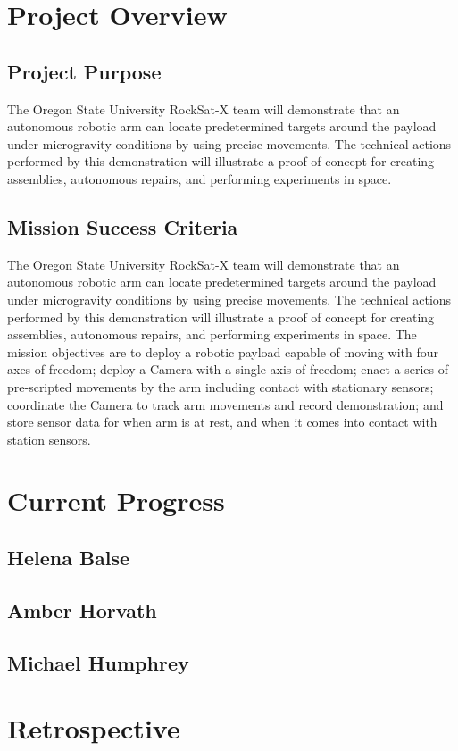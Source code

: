 \documentclass[letterpaper,10pt]{article}
\begin{document}
\section{Project Overview}
\subsection{Project Purpose}
The Oregon State University RockSat-X team will demonstrate that an autonomous robotic arm can locate predetermined
 targets around the \gls{payload} under microgravity conditions by using precise movements. 
The technical actions performed by this demonstration will illustrate a proof of concept for creating assemblies, 
autonomous repairs, and performing experiments in space.
\subsection{Mission Success Criteria}
The Oregon State University RockSat-X team will demonstrate that an autonomous robotic arm can locate predetermined targets around the 
\gls{payload} under microgravity conditions by using precise movements. The technical actions performed by this demonstration will illustrate 
a proof of concept for creating assemblies, autonomous repairs, and performing experiments in space. 
The mission objectives are to deploy a robotic \gls{payload} capable of moving with four axes of freedom; deploy a Camera with a single axis 
of freedom;
enact a series of pre-scripted movements by the arm including contact with stationary sensors;
coordinate the Camera to track arm movements and record demonstration; and
store sensor data for when arm is at rest, and when it comes into contact with station sensors.
\section{Current Progress}
\subsection{Helena Balse}

\subsection{Amber Horvath}

\subsection{Michael Humphrey}

\section{Retrospective}

\end{document}

